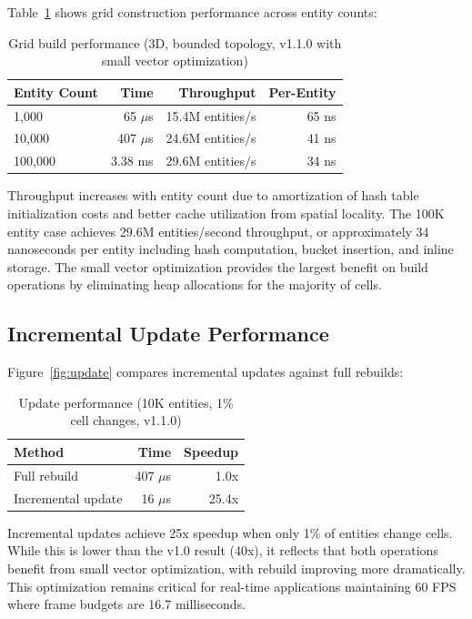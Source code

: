 \documentclass[11pt]{article}
\begin{document}
Table~\ref{tab:build} shows grid construction performance across entity counts:

\begin{table}[h]
\centering
\caption{Grid build performance (3D, bounded topology, v1.1.0 with small vector optimization)}
\label{tab:build}
\begin{tabular}{lrrr}
\toprule
Entity Count & Time & Throughput & Per-Entity \\
\midrule
1,000 & 65 $\mu$s & 15.4M entities/s & 65 ns \\
10,000 & 407 $\mu$s & 24.6M entities/s & 41 ns \\
100,000 & 3.38 ms & 29.6M entities/s & 34 ns \\
\bottomrule
\end{tabular}
\end{table}

Throughput increases with entity count due to amortization of hash table initialization costs and better cache utilization from spatial locality. The 100K entity case achieves 29.6M entities/second throughput, or approximately 34 nanoseconds per entity including hash computation, bucket insertion, and inline storage. The small vector optimization provides the largest benefit on build operations by eliminating heap allocations for the majority of cells.

\subsection{Incremental Update Performance}

Figure~\ref{fig:update} compares incremental updates against full rebuilds:

\begin{table}[h]
\centering
\caption{Update performance (10K entities, 1\% cell changes, v1.1.0)}
\label{tab:update}
\begin{tabular}{lrr}
\toprule
Method & Time & Speedup \\
\midrule
Full rebuild & 407 $\mu$s & 1.0x \\
Incremental update & 16 $\mu$s & 25.4x \\
\bottomrule
\end{tabular}
\end{table}

Incremental updates achieve 25x speedup when only 1\% of entities change cells. While this is lower than the v1.0 result (40x), it reflects that both operations benefit from small vector optimization, with rebuild improving more dramatically. This optimization remains critical for real-time applications maintaining 60 FPS where frame budgets are 16.7 milliseconds.
\end{document}
